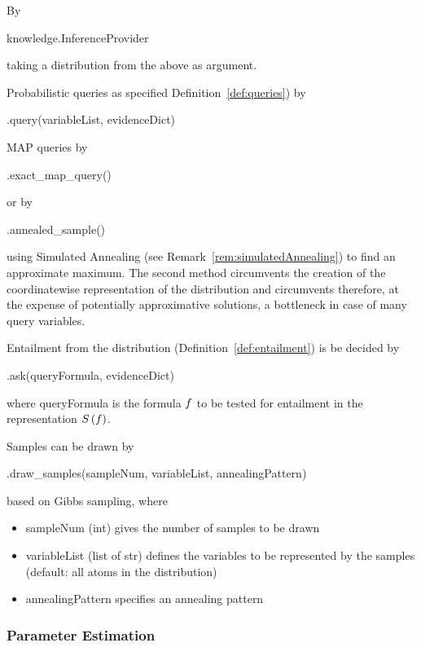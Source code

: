 By
\begin{centeredcode}
	knowledge.InferenceProvider
\end{centeredcode}
taking a distribution from the above as argument.

Probabilistic queries as specified Definition~\ref{def:queries})  by 
\begin{centeredcode}
	.query(variableList, evidenceDict)
\end{centeredcode}

MAP queries by
\begin{centeredcode}
	.exact\_map\_query()
\end{centeredcode}
or by
\begin{centeredcode}
	.annealed\_sample()
\end{centeredcode}
using Simulated Annealing (see Remark~\ref{rem:simulatedAnnealing}) to find an approximate maximum.
The second method circumvents the creation of the coordinatewise representation of the distribution and circumvents therefore, at the expense of potentially approximative solutions, a bottleneck in case of many query variables.

Entailment from the distribution (Definition~\ref{def:entailment}) is be decided by 
\begin{centeredcode}
	.ask(queryFormula, evidenceDict)
\end{centeredcode}
where queryFormula is the formula $f$ to be tested for entailment in the representation $S\left(f\right)$.

Samples can be drawn by
\begin{centeredcode}
	.draw\_samples(sampleNum, variableList, annealingPattern)
\end{centeredcode}
based on Gibbs sampling, where
\begin{itemize}
	\item sampleNum (int) gives the number of samples to be drawn
	\item variableList (list of str) defines the variables to be represented by the samples (default: all atoms in the distribution)
	\item annealingPattern specifies an annealing pattern 
\end{itemize}


\subsubsection{Parameter Estimation}

